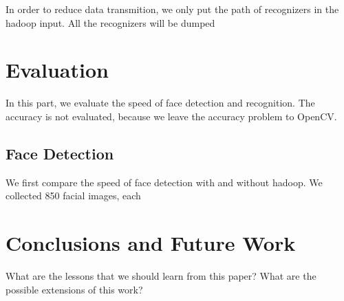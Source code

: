 \documentclass[11pt, draftclsnofoot, onecolumn]{IEEEtran}
\begin{document}
In order to reduce data transmition, we only put the path of recognizers in the hadoop input. All the recognizers will be dumped 

\section{Evaluation} \label{sec:evaluation}

In this part, we evaluate the speed of face detection and recognition. The accuracy is not evaluated, because we leave the accuracy problem to OpenCV.

\subsection{Face Detection}
We first compare the speed of face detection with and without hadoop. We collected 850 facial images, each 

\section{Conclusions and Future Work} \label{sec:conclusion}

What are the lessons that we should learn from this paper? 
What are the possible extensions of this work?


   
\end{document}
